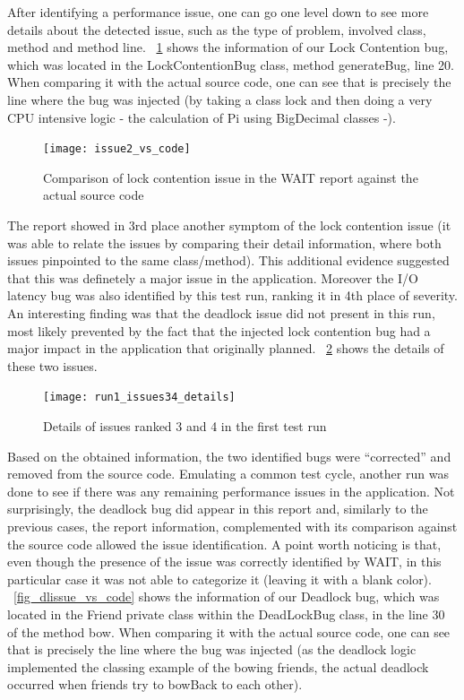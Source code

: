 \documentclass[runningheads,a4paper]{llncs}
\begin{document}
After identifying a performance issue, one can go one level down to see more
details about the detected issue, such as the type of problem, involved class, method and method line. 
\figurename ~\ref{fig_issue2_vs_code} shows the information of our Lock
Contention bug, which was located in the LockContentionBug class, method
generateBug, line 20. When comparing it with the actual source code, one can
see that is precisely the line where the bug was injected (by taking a class
lock and then doing a very CPU intensive logic - the calculation of Pi using
BigDecimal classes -).

\begin{figure}[!h]
\texttt{[image: issue2\_vs\_code]}
\caption{Comparison of lock contention issue in the WAIT report against the
actual source code}
\label{fig_issue2_vs_code}
\end{figure}

The report showed in 3rd place another symptom of the lock contention issue
(it was able to relate the issues by comparing their detail information, where
both issues pinpointed to the same class/method). This additional evidence
suggested that this was definetely a major issue in the application. Moreover
the I/O latency bug was also identified by this test run, ranking it in 4th
place of severity. An interesting finding was that the deadlock issue did not
present in this run, most likely prevented by the fact that the injected lock
contention bug had a major impact in the application that originally planned.
\figurename ~\ref{fig_issues34} shows the details of these two issues.

\begin{figure}[!h]
\texttt{[image: run1\_issues34\_details]}
\caption{Details of issues ranked 3 and 4 in the first test run}
\label{fig_issues34}
\end{figure}

Based on the obtained information, the two identified bugs were ``corrected''
and removed from the source code. Emulating a common test cycle, another run
was done to see if there was any remaining performance issues in the
application. Not surprisingly, the deadlock bug did appear in this report and,
similarly to the previous cases, the report information, complemented
with its comparison against the source code allowed the issue identification.
A point worth noticing is that, even though the presence of the issue was
correctly identified by WAIT, in this particular case it was not able to
categorize it (leaving it with a blank color). \figurename
~\ref{fig_dlissue_vs_code} shows the information of our Deadlock bug, which was
located in the Friend private class within the DeadLockBug class, in the line
30 of the method bow. When comparing it with the actual source code, one can
see that is precisely the line where the bug was injected (as the deadlock logic 
implemented the classing example of the bowing friends, the actual deadlock
occurred when friends try to bowBack to each other).
\end{document}
